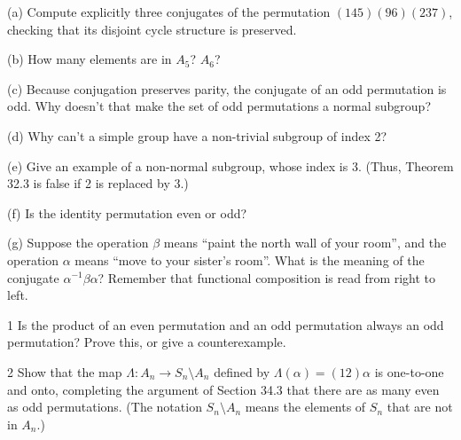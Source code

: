 \begin{problem}[Warmup]{(a)}
    Compute explicitly three conjugates of the permutation $(145)(96)(237)$, checking that its disjoint cycle structure is preserved.
\end{problem}
\unsolved

\begin{problem}[Warmup]{(b)}
    How many elements are in $A_5$? $A_6$?
\end{problem}
\unsolved

\begin{problem}[Warmup]{(c)}
    Because conjugation preserves parity, the conjugate of an odd permutation is odd. Why doesn't that make the set of odd permutations a normal subgroup?
\end{problem}
\unsolved

\begin{problem}[Warmup]{(d)}
    Why can't a simple group have a non-trivial subgroup of index 2?
\end{problem}
\unsolved

\begin{problem}[Warmup]{(e)}
    Give an example of a non-normal subgroup, whose index is 3. (Thus, Theorem 32.3 is false if 2 is replaced by 3.)
\end{problem}
\unsolved

\begin{problem}[Warmup]{(f)}
    Is the identity permutation even or odd?
\end{problem}
\unsolved

\begin{problem}[Warmup]{(g)}
    Suppose the operation $\beta$ means ``paint the north wall of your room'', and the operation $\alpha$ means ``move to your sister's room''. What is the meaning of the conjugate $\alpha^{-1}\beta\alpha$? Remember that functional composition is read from right to left.
\end{problem}
\unsolved

\begin{problem}{1}
    Is the product of an even permutation and an odd permutation always an odd
    permutation? Prove this, or give a counterexample.
\end{problem}
\unsolved

\begin{problem}{2}
    Show that the map $\Lambda : A_n \to S_n \setminus A_n$ defined by
    $\Lambda(\alpha) = (12)\alpha$ is one-to-one and onto, completing the argument of
    Section 34.3 that there are as many even as odd permutations. (The notation
    $S_n \setminus A_n$ means the elements of $S_n$ that are not in $A_n$.)
\end{problem}
\unsolved

